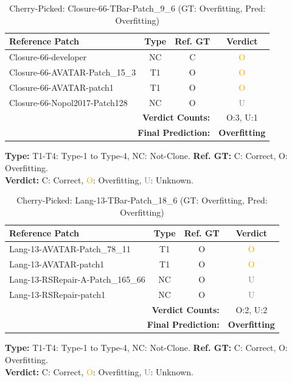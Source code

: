 \begin{table}[t]
\centering
\caption{Cherry-Picked: Closure-66-TBar-Patch\_9\_6 (GT: Overfitting, Pred: Overfitting)}
\label{tab:cherry-Closure66TBarPatch96}
\footnotesize
\renewcommand{\arraystretch}{1.1}
\setlength{\tabcolsep}{4pt}
\begin{tabular}{l|c|c|c}
\hline
\textbf{Reference Patch} & \textbf{Type} & \textbf{Ref. GT} & \textbf{Verdict} \\
\hline
Closure-66-developer & NC & C & \textcolor{orange}{O} \\
Closure-66-AVATAR-Patch\_15\_3 & T1 & O & \textcolor{orange}{O} \\
Closure-66-AVATAR-patch1 & T1 & O & \textcolor{orange}{O} \\
Closure-66-Nopol2017-Patch128 & NC & O & \textcolor{gray}{U} \\
\hline
\multicolumn{3}{r|}{\textbf{Verdict Counts:}} & O:3, U:1 \\
\multicolumn{3}{r|}{\textbf{Final Prediction:}} & \textbf{Overfitting} \\
\hline
\end{tabular}
\vspace{1mm}
\parbox{\linewidth}{\centering\footnotesize 
\vspace{1mm}
\textbf{Type:} T1-T4: Type-1 to Type-4, NC: Not-Clone. \;
\textbf{Ref. GT:} C: Correct, O: Overfitting. \\
\textbf{Verdict:} \textcolor{green!60!black}{C}: Correct, \textcolor{orange}{O}: Overfitting, \textcolor{gray}{U}: Unknown.}
\end{table}


\begin{table}[t]
\centering
\caption{Cherry-Picked: Lang-13-TBar-Patch\_18\_6 (GT: Overfitting, Pred: Overfitting)}
\label{tab:cherry-Lang13TBarPatch186}
\footnotesize
\renewcommand{\arraystretch}{1.1}
\setlength{\tabcolsep}{4pt}
\begin{tabular}{l|c|c|c}
\hline
\textbf{Reference Patch} & \textbf{Type} & \textbf{Ref. GT} & \textbf{Verdict} \\
\hline
Lang-13-AVATAR-Patch\_78\_11 & T1 & O & \textcolor{orange}{O} \\
Lang-13-AVATAR-patch1 & T1 & O & \textcolor{orange}{O} \\
Lang-13-RSRepair-A-Patch\_165\_66 & NC & O & \textcolor{gray}{U} \\
Lang-13-RSRepair-patch1 & NC & O & \textcolor{gray}{U} \\
\hline
\multicolumn{3}{r|}{\textbf{Verdict Counts:}} & O:2, U:2 \\
\multicolumn{3}{r|}{\textbf{Final Prediction:}} & \textbf{Overfitting} \\
\hline
\end{tabular}
\vspace{1mm}
\parbox{\linewidth}{\centering\footnotesize 
\vspace{1mm}
\textbf{Type:} T1-T4: Type-1 to Type-4, NC: Not-Clone. \;
\textbf{Ref. GT:} C: Correct, O: Overfitting. \\
\textbf{Verdict:} \textcolor{green!60!black}{C}: Correct, \textcolor{orange}{O}: Overfitting, \textcolor{gray}{U}: Unknown.}
\end{table}



